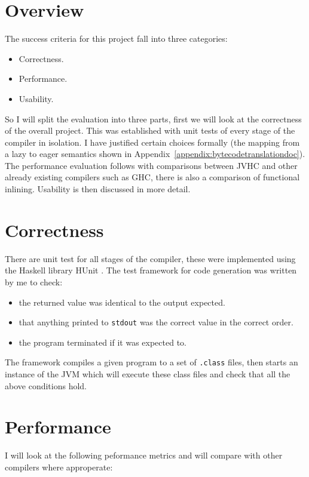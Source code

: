 \documentclass[float=false, crop=false]{standalone}
\begin{document}
\section{Overview}

The success criteria for this project fall into three categories:
\begin{itemize}
  \item Correctness.
  \item Performance.
  \item Usability.
\end{itemize}

So I will split the evaluation into three parts, first we will
look at the correctness of the overall project. This was established 
with unit tests of every stage of the compiler in isolation. I 
have justified certain choices formally (the mapping from a lazy to eager semantics
shown in Appendix~\ref{appendix:bytecodetranslationdoc}). The performance evaluation follows 
with comparisons between JVHC and other already existing compilers such as
GHC, there is also a comparison of functional inlining. Usability is then discussed in more detail.

\section{Correctness}

There are unit test for all stages of the compiler, these were implemented 
using the Haskell library HUnit \cite{hunit-lib}. The test framework for code generation
was written by me to check:
\begin{itemize}
  \item the returned value was identical to the output expected. 
  \item that anything printed to \texttt{stdout} was the correct value in the correct order. 
  \item the program terminated if it was expected to.
\end{itemize}
  The framework compiles a given program to a set of \texttt{.class} files, then 
  starts an instance of the JVM which will execute these class files
  and check that all the above conditions hold.
\section{Performance}

I will look at the following peformance metrics and will compare with other compilers where
approperate:
\end{document}
